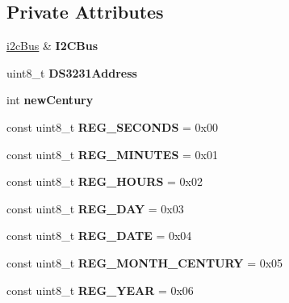 \subsection*{Private Attributes}
\begin{DoxyCompactItemize}
\item 
\mbox{\label{class_d_s3231_acffbcfc655349fd392b97dff5f18a56f}} 
\mbox{\hyperlink{classi2c_bus}{i2c\+Bus}} \& {\bfseries I2\+C\+Bus}
\item 
\mbox{\label{class_d_s3231_a905b445bb664b52529b3acbccbbaccb3}} 
uint8\+\_\+t {\bfseries D\+S3231\+Address}
\item 
\mbox{\label{class_d_s3231_a15fb987b624cdddde40a15db36665221}} 
int {\bfseries new\+Century}
\item 
\mbox{\label{class_d_s3231_aaede356dfbcd2f22e8ac4103e67d4f8e}} 
const uint8\+\_\+t {\bfseries R\+E\+G\+\_\+\+S\+E\+C\+O\+N\+DS} = 0x00
\item 
\mbox{\label{class_d_s3231_affe134ab59f11a0fe7243f1172466fc2}} 
const uint8\+\_\+t {\bfseries R\+E\+G\+\_\+\+M\+I\+N\+U\+T\+ES} = 0x01
\item 
\mbox{\label{class_d_s3231_a80f6664a64967b5383933d314b57c7bc}} 
const uint8\+\_\+t {\bfseries R\+E\+G\+\_\+\+H\+O\+U\+RS} = 0x02
\item 
\mbox{\label{class_d_s3231_a7fc54a4d1b80a74b003b451ee8fa6eda}} 
const uint8\+\_\+t {\bfseries R\+E\+G\+\_\+\+D\+AY} = 0x03
\item 
\mbox{\label{class_d_s3231_ad51434b6ef3bbc02bb2ddb18c1b70f2b}} 
const uint8\+\_\+t {\bfseries R\+E\+G\+\_\+\+D\+A\+TE} = 0x04
\item 
\mbox{\label{class_d_s3231_a20ac9f897ca08f0968c24c9a66703159}} 
const uint8\+\_\+t {\bfseries R\+E\+G\+\_\+\+M\+O\+N\+T\+H\+\_\+\+C\+E\+N\+T\+U\+RY} = 0x05
\item 
\mbox{\label{class_d_s3231_ada659ad8327043d2dc7e92988a943c03}} 
const uint8\+\_\+t {\bfseries R\+E\+G\+\_\+\+Y\+E\+AR} = 0x06

\end{DoxyCompactItemize}
